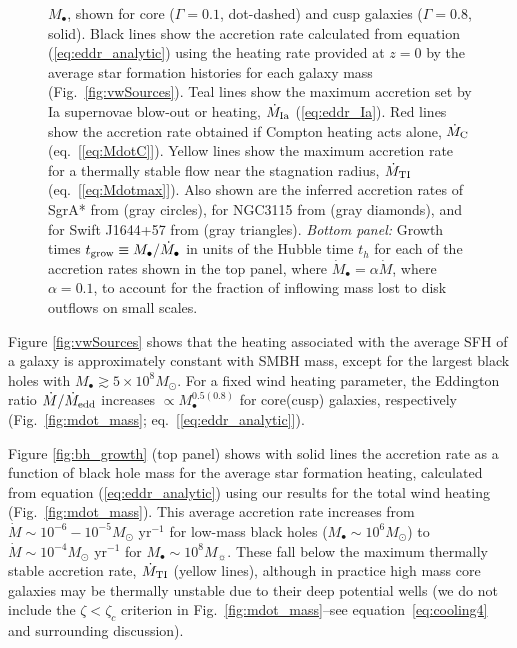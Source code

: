 \documentclass[usenatbib,fleqn]{mn2e}
\newcommand{\Mbh}[1][]{M_{\bullet#1}}
\renewcommand{\th}{t_h}
\begin{document}
\begin{figure}
{  $M_{\bullet}$, shown for core ($\Gamma=0.1$, dot-dashed) and cusp
  galaxies ($\Gamma=0.8$, solid).  Black lines show the accretion rate
  calculated from equation (\ref{eq:eddr_analytic}) using the heating
  rate provided at $z = 0$ by the average star formation histories for
  each galaxy mass (Fig.~\ref{fig:vwSources}).  Teal lines show the
  maximum accretion set by Ia supernovae blow-out or heating,
  $\dot{M}_{\rm Ia}$ (\ref{eq:eddr_Ia}).  Red lines show the accretion
  rate obtained if Compton heating acts alone, $\dot{M}_{\rm C}$
  (eq.~[\ref{eq:MdotC}]).  Yellow lines show the maximum accretion
  rate for a thermally stable flow near the stagnation radius,
  $\dot{M}_{\rm TI}$ (eq.~[\ref{eq:Mdotmax}]).  Also shown are the
  inferred accretion rates of SgrA* from \citet{Quataert:2004a} (gray
  circles), for NGC3115 from \citet{ShcherbakovWong+:2014a} (gray
  diamonds), and for Swift J1644+57 from \citet{BergerZauderer+:2012a}
  (gray triangles).  {\it Bottom panel:} Growth times $t_{\rm grow}
  \equiv \Mbh/\dot{M}_{\bullet}$ in units of the Hubble time $\th$ for
  each of the accretion rates shown in the top panel, where
  $\dot{M}_{\bullet} = \alpha\dot{M}$, where $\alpha = 0.1$, to
  account for the fraction of inflowing mass lost to disk outflows on
  small scales.}
\end{figure}

Figure \ref{fig:vwSources} shows that the heating associated with the
average SFH of a galaxy is approximately constant
with SMBH mass, except for the largest black holes with $M_{\bullet}
\gtrsim 5\times 10^{8}M_{\odot}$.  For a fixed wind heating parameter,
the Eddington ratio $\dot{M}/\dot{M}_{\rm edd}$ increases $\propto
M_{\bullet}^{0.5(0.8)}$ for core(cusp) galaxies, respectively
(Fig.~\ref{fig:mdot_mass}; eq.~[\ref{eq:eddr_analytic}]).

Figure \ref{fig:bh_growth} (top panel) shows with solid lines the
accretion rate as a function of black hole mass for the average star
formation heating, calculated from equation (\ref{eq:eddr_analytic})
using our results for the total wind heating
(Fig.~\ref{fig:mdot_mass}).  This average accretion rate increases
from $\dot{M} \sim 10^{-6}-10^{-5}M_{\odot}$ yr$^{-1}$ for low-mass
black holes ($M_{\bullet} \sim 10^{6}M_{\odot}$) to $\dot{M} \sim
10^{-4}M_{\odot}$ yr$^{-1}$ for $M_{\bullet} \sim 10^{8}M_{\sun}$.
These fall below the maximum thermally stable accretion rate,
$\dot{M}_{\rm TI}$ (yellow lines), although in practice high mass core
galaxies may be thermally unstable due to their deep potential wells
(we do not include the $\zeta<\zeta_c$ criterion in
Fig.~\ref{fig:mdot_mass}--see equation~\eqref{eq:cooling4} and
surrounding discussion).
\end{document}
